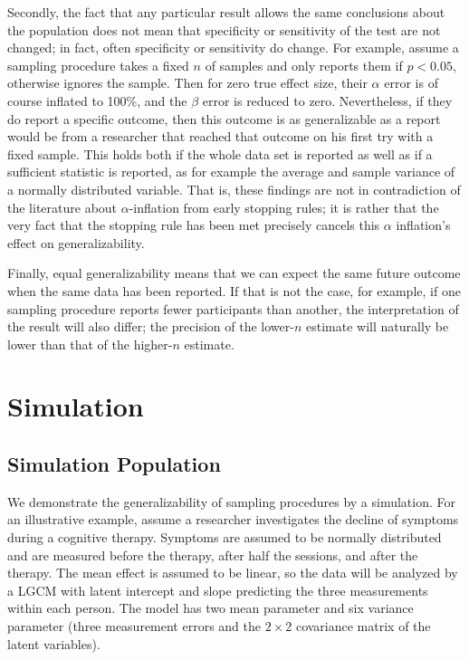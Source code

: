\documentclass[man]{apa7}\usepackage[]{graphicx}\usepackage[]{xcolor}
\theoremstyle{definition}
\begin{document}
Secondly, the fact that any particular result allows the same conclusions about the population does not mean that specificity or sensitivity of the test are not changed; in fact, often specificity or sensitivity do change. For example, assume a sampling procedure takes a fixed $n$ of samples and only reports them if $p < 0.05$, otherwise ignores the sample. Then for zero true effect size, their $\alpha$ error is of course inflated to 100\%, and the $\beta$ error is reduced to zero. Nevertheless, if they do report a specific outcome, then this outcome is as generalizable as a report would be from a researcher that reached that outcome on his first try with a fixed sample. This holds both if the whole data set is reported as well as if a sufficient statistic is reported, as for example the average and sample variance of a normally distributed variable. That is, these findings are not in contradiction of the literature about $\alpha$-inflation from early stopping rules; it is rather that the very fact that the stopping rule has been met precisely cancels this $\alpha$ inflation's effect on generalizability.

Finally, equal generalizability means that we can expect the same future outcome when the same data has been reported. If that is not the case, for example, if one sampling procedure reports fewer participants than another, the interpretation of the result will also differ; the precision of the lower-$n$ estimate will naturally be lower than that of the higher-$n$ estimate. 


\section{Simulation}
\subsection{Simulation Population}
We demonstrate the generalizability of sampling procedures by a simulation. For an illustrative example, assume a researcher investigates the decline of symptoms during a cognitive therapy. Symptoms are assumed to be normally distributed and are measured before the therapy, after half the sessions, and after the therapy. The mean effect is assumed to be linear, so the data will be analyzed by a LGCM with latent intercept and slope predicting the three measurements within each person. The model has two mean parameter and six variance parameter (three measurement errors and the $2\times2$ covariance matrix of the latent variables). 
\end{document}
